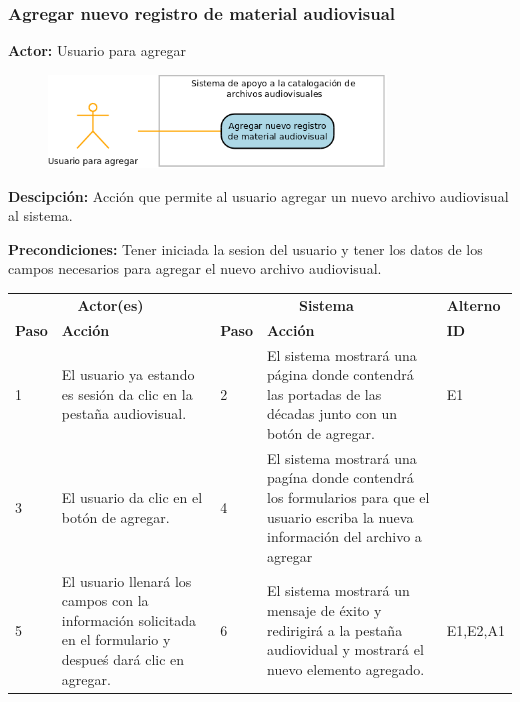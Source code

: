 \documentclass[10pt,letterpaper]{article}
\begin{document}
\subsubsection{Agregar nuevo registro de material audiovisual}
\textbf{Actor:} Usuario para agregar

\begin{figure}[H]
	\centering
	\includegraphics[width=0.8\textwidth]{CasoDeUso_Agregar_AgregarNuevoRegistro.png}
\end{figure}

\textbf{Descipción: } Acción que permite al usuario agregar un nuevo archivo audiovisual al sistema.

\textbf{Precondiciones:} Tener iniciada la sesion del usuario y tener los datos de los campos necesarios para agregar el nuevo archivo audiovisual.

\begin{adjustwidth}{-6em}{-6em}
	\begin{center}
		\begin{tabularx}{1.2\textwidth}{ | p{0.7cm} | X | p{0.7cm} | X | p{1.5cm} | }
			\hline
			\rowcolor{NewBlue} \multicolumn{5}{|c|}{\textbf{Flujo normal de eventos}} \\
			\hline
			\multicolumn{2}{|c|}{\textbf{Actor(es)}}	&	\multicolumn{2}{c|}{\textbf{Sistema}}	&	\textbf{Alterno} \\
			\hline
			\textbf{Paso}	&	\textbf{Acción}	&	\textbf{Paso}	&	\textbf{Acción}	&	\textbf{ID} \\
			\hline
			1 & 
			 El usuario ya estando es sesión da clic en la pestaña audiovisual.&
			2 &
			El sistema mostrará una página donde contendrá las portadas de las décadas junto con un botón de agregar.&
			E1
			\\
			\hline
			3 & 
			 El usuario da clic en el botón de agregar.&
			4 &
			El sistema mostrará una pagína donde contendrá los formularios para que el usuario escriba la nueva información del archivo a agregar&
			\\
			\hline
			5 & 
			 El usuario llenará los campos con la información solicitada en el formulario y despueś dará clic en agregar.&
			6 &
			El sistema mostrará un mensaje de éxito y redirigirá a la pestaña audiovidual y mostrará el nuevo elemento agregado.&
			E1,E2,A1
			\\
			\hline
		\end{tabularx}
	\end{center}
\end{adjustwidth}
\end{document}
